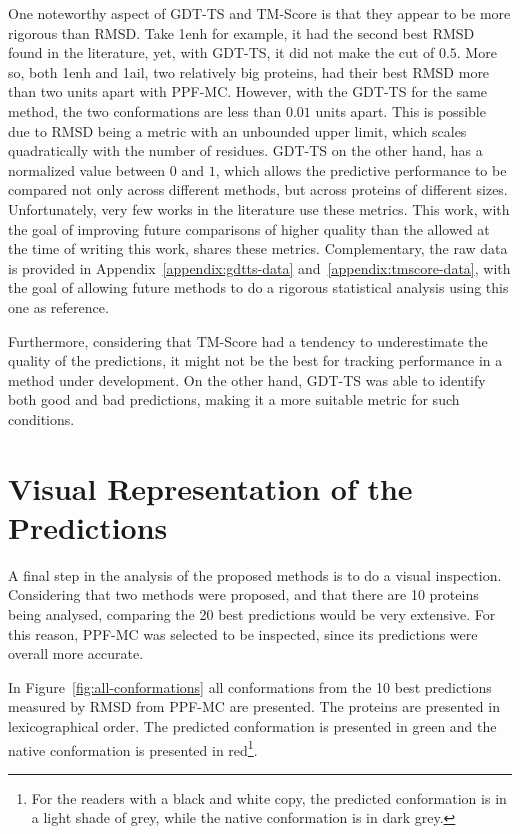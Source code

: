 One noteworthy aspect of GDT-TS and TM-Score is that they appear to be more
rigorous than RMSD. Take 1enh for example, it had the second best RMSD found
in the literature, yet, with GDT-TS, it did not make the cut of $0.5$. More so,
both 1enh and 1ail, two relatively big proteins, had their best RMSD more
than two units apart with PPF-MC. However, with the GDT-TS for the same
method, the two conformations are less than $0.01$ units apart. This is possible
due to RMSD being a metric with an unbounded upper limit, which scales
quadratically with the number of residues. GDT-TS on the other hand, has a
normalized value between $0$ and $1$, which allows the predictive performance
to be compared not only across different methods, but across proteins of different sizes.
Unfortunately, very few works in the literature use these metrics. This work,
with the goal of improving future comparisons of higher quality than the allowed
at the time of writing this work, shares these metrics. Complementary, the raw data is
provided in Appendix~\ref{appendix:gdtts-data} and~\ref{appendix:tmscore-data},
with the goal of allowing future methods to do a rigorous statistical analysis
using this one as reference.

Furthermore, considering that TM-Score had a tendency to underestimate the quality
of the predictions, it might not be the best for tracking performance in a
method under development. On the other hand, GDT-TS was able to identify both
good and bad predictions, making it a more suitable metric for such conditions.

\section{Visual Representation of the Predictions}
\label{sec:visual-analysis}

A final step in the analysis of the proposed methods is to do a visual
inspection. Considering that two methods were proposed, and that there are 10
proteins being analysed, comparing the 20 best predictions would be very
extensive. For this reason, PPF-MC was selected to be inspected, since
its predictions were overall more accurate.



In Figure~\ref{fig:all-conformations} all conformations from the 10 best
predictions measured by RMSD from PPF-MC are presented. The proteins are presented in
lexicographical order. The predicted conformation is presented in green and the
native conformation is presented in red\footnote{For the readers with a black
and white copy, the predicted conformation is in a light shade of grey, while
the native conformation is in dark grey.}.

